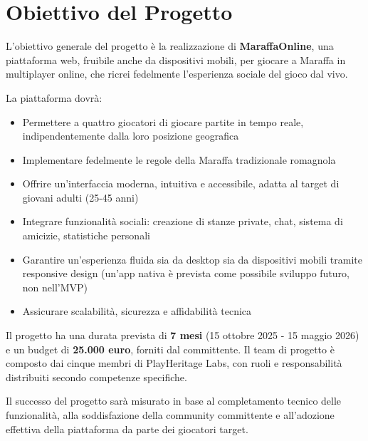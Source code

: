 \section{Obiettivo del Progetto}

L'obiettivo generale del progetto è la realizzazione di \textbf{MaraffaOnline}, una piattaforma web, fruibile anche da dispositivi mobili, per giocare a Maraffa in multiplayer online, che ricrei fedelmente l'esperienza sociale del gioco dal vivo.

La piattaforma dovrà:
\begin{itemize}
    \item Permettere a quattro giocatori di giocare partite in tempo reale, indipendentemente dalla loro posizione geografica
    \item Implementare fedelmente le regole della Maraffa tradizionale romagnola
    \item Offrire un'interfaccia moderna, intuitiva e accessibile, adatta al target di giovani adulti (25-45 anni)
    \item Integrare funzionalità sociali: creazione di stanze private, chat, sistema di amicizie, statistiche personali
    \item Garantire un'esperienza fluida sia da desktop sia da dispositivi mobili tramite responsive design (un'app nativa è prevista come possibile sviluppo futuro, non nell'MVP)
    \item Assicurare scalabilità, sicurezza e affidabilità tecnica
\end{itemize}

Il progetto ha una durata prevista di \textbf{7 mesi} (15 ottobre 2025 - 15 maggio 2026) e un budget di \textbf{25.000 euro}, forniti dal committente. Il team di progetto è composto dai cinque membri di PlayHeritage Labs, con ruoli e responsabilità distribuiti secondo competenze specifiche.

Il successo del progetto sarà misurato in base al completamento tecnico delle funzionalità, alla soddisfazione della community committente e all'adozione effettiva della piattaforma da parte dei giocatori target.
